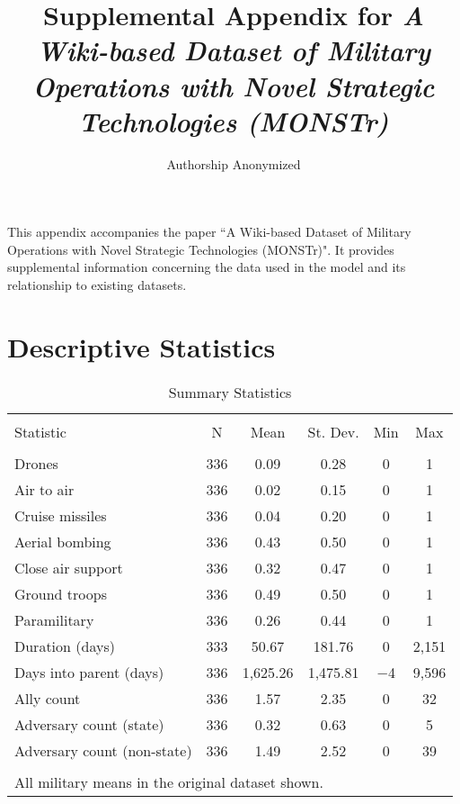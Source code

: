 \documentclass[fleqn,12pt]{article}
\title{\singlespacing Supplemental Appendix for \textit{A Wiki-based Dataset of Military Operations with Novel Strategic Technologies (MONSTr)}}
\author{Authorship Anonymized}
\date{}
\begin{document}
\maketitle

\doublespacing
\renewcommand\thetable{A\arabic{table}}
\renewcommand\thefigure{A\arabic{figure}}
\thispagestyle{empty}

This appendix accompanies the paper ``A Wiki-based Dataset of Military Operations with Novel Strategic Technologies (MONSTr)". It provides supplemental information concerning the data used in the model and its relationship to existing datasets.

\tableofcontents

\newpage

\section{Descriptive Statistics}

\begin{table}[!htbp] \centering 
  \caption{Summary Statistics} 
  \label{tab:summary-stats} 
\begin{tabular}{@{\extracolsep{5pt}}lccccc} 
\\[-1.8ex]\hline 
\hline \\[-1.8ex] 
Statistic & \multicolumn{1}{c}{N} & \multicolumn{1}{c}{Mean} & \multicolumn{1}{c}{St. Dev.} & \multicolumn{1}{c}{Min} & \multicolumn{1}{c}{Max} \\ 
\hline \\[-1.8ex] 
Drones & 336 & 0.09 & 0.28 & 0 & 1 \\ 
Air to air & 336 & 0.02 & 0.15 & 0 & 1 \\ 
Cruise missiles & 336 & 0.04 & 0.20 & 0 & 1 \\ 
Aerial bombing & 336 & 0.43 & 0.50 & 0 & 1 \\ 
Close air support & 336 & 0.32 & 0.47 & 0 & 1 \\ 
Ground troops & 336 & 0.49 & 0.50 & 0 & 1 \\ 
Paramilitary & 336 & 0.26 & 0.44 & 0 & 1 \\ 
Duration (days) & 333 & 50.67 & 181.76 & 0 & 2,151 \\ 
Days into parent (days) & 336 & 1,625.26 & 1,475.81 & $-$4 & 9,596 \\ 
Ally count & 336 & 1.57 & 2.35 & 0 & 32 \\ 
Adversary count (state) & 336 & 0.32 & 0.63 & 0 & 5 \\ 
Adversary count (non-state) & 336 & 1.49 & 2.52 & 0 & 39 \\ 
\hline \\[-1.8ex] 
\multicolumn{6}{l}{All military means in the original dataset shown.} \\ 
\end{tabular} 
\end{table}
\end{document}
